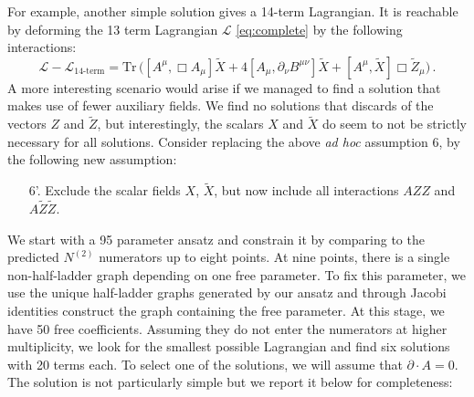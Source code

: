 \documentclass[11pt,a4paper]{article}
\begin{document}
For example, another simple solution gives a 14-term Lagrangian. It is reachable by deforming the 13 term Lagrangian $\mathcal{L}$ \eqref{eq:complete} by the following interactions:
\begin{equation}
\label{eq:lag14term}
\mathcal{L} - \mathcal{L}_\text{14-term} = \text{Tr} \, \Big( [A^\mu, \Box A_\mu] \tilde{X} + 4 [A_\mu, \partial_\nu B^{\mu \nu}] \tilde{X} + [A^\mu, \tilde{X}] \Box \tilde{Z}_\mu \Big) \, .
\end{equation}
%
A more interesting scenario would arise if we managed to find a solution that makes use of fewer  auxiliary fields. We find no solutions that discards of the vectors $Z$ and $\tilde{Z}$, but interestingly, the scalars $X$ and $\tilde{X}$ do seem to not be strictly necessary for all solutions.  Consider replacing the above {\it ad hoc} assumption 6, by the following new assumption:
\begin{enumerate}
\item[6'.]{Exclude the scalar fields $X$, $\tilde{X}$, but now include all interactions $AZZ$ and $A \tilde{Z} \tilde{Z}$.}
\end{enumerate}
We start with a 95 parameter ansatz and constrain it by comparing to the predicted $N^{(2)}$ numerators up to eight points. At nine points, there is a single non-half-ladder graph depending on one free parameter. To fix this parameter, we use the unique half-ladder graphs generated by our ansatz and through Jacobi identities construct the graph containing the free parameter. At this stage, we have 50 free coefficients. Assuming they do not enter the numerators at higher multiplicity, we look for the smallest possible Lagrangian and find six solutions with 20 terms each. To select one of the solutions, we will assume that $\partial \cdot A = 0$. The solution is not particularly simple but we report it below for completeness:
\end{document}
